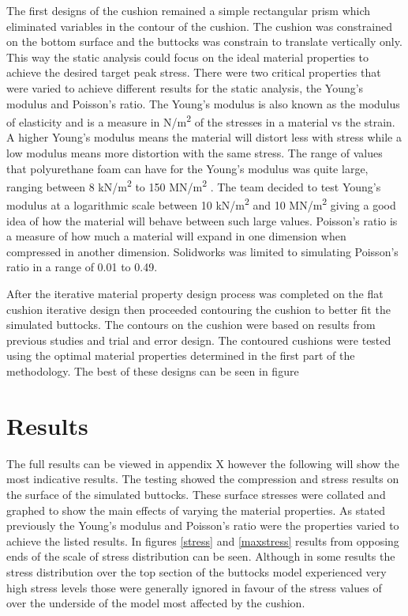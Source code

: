 \documentclass[conference]{IEEEtran}
\begin{document}
The first designs of the cushion remained a simple rectangular prism which eliminated variables in the contour of the cushion. The cushion was constrained on the bottom surface and the buttocks was constrain to translate vertically only. This way the static analysis could focus on the ideal material properties to achieve the desired target peak stress. There were two critical properties that were varied to achieve different results for the static analysis, the Young's modulus and Poisson's ratio. The Young's modulus is also known as the modulus of elasticity and is a measure in N/m\textsuperscript{2} of the stresses in a material vs the strain. A higher Young's modulus means the material will distort less with stress while a low modulus means more distortion with the same stress. The range of values that polyurethane foam can have for the Young's modulus was quite large, ranging between 8 kN/m\textsuperscript{2} to 150 MN/m\textsuperscript{2} \cite{Patel2008}. The team decided to test Young's modulus at a logarithmic scale between 10 kN/m\textsuperscript{2} and 10 MN/m\textsuperscript{2} giving a good idea of how the material will behave between such large values. Poisson's ratio is a measure of how much a material will expand in one dimension when compressed in another dimension. Solidworks was limited to simulating Poisson's ratio in a range of 0.01 to 0.49. 



After the iterative material property design process was completed on the flat cushion iterative design then proceeded contouring the cushion to better fit the simulated buttocks. The contours on the cushion were based on results from previous studies and trial and error design. The contoured cushions were tested using the optimal material properties determined in the first part of the methodology. The best of these designs can be seen in figure

\section{Results}

The full results can be viewed in appendix X however the following will show the most indicative results. The testing showed the compression and stress results on the surface of the simulated buttocks. These surface stresses were collated and graphed to show the main effects of varying the material properties. As stated previously the Young's modulus and Poisson's ratio were the properties varied to achieve the listed results. In figures \ref{stress} and \ref{maxstress} results from opposing ends of the scale of stress distribution can be seen. Although in some results the stress distribution over the top section of the buttocks model experienced very high stress levels those were generally ignored in favour of the stress values of over the underside of the model most affected by the cushion.
\end{document}
